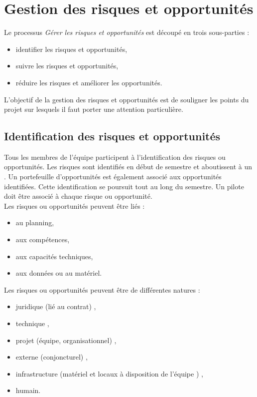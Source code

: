 \section{Gestion des risques et opportunités} 
\label{gestion_risques_opportunitees}

Le processus \textit{Gérer les risques et opportunités} est découpé en trois sous-parties : 
\begin{itemize}
\item identifier les risques et opportunités,
\item suivre les risques et opportunités,
\item réduire les risques et améliorer les opportunités. \\
\end{itemize}

L'objectif de la gestion des risques et opportunités est de souligner les points du projet sur lesquels il faut porter une attention particulière. 

\subsection{Identification des risques et opportunités}
\label{identification_risques_opportunitees}

Tous les membres de l'équipe participent à l'identification des risques ou opportunités. Les risques sont identifiés en début de semestre et aboutissent à un \PR. Un portefeuille d'opportunités est également associé aux opportunités identifiées. Cette identification se poursuit tout au long du semestre. Un pilote doit être associé à chaque risque ou opportunité.\\ 

Les risques ou opportunités peuvent être liés :
\begin{itemize}
\item au planning,
\item aux compétences,
\item aux capacités techniques,
\item aux données ou au matériel. \\
\end{itemize}

Les risques ou opportunités peuvent être de différentes natures :
\begin{itemize}
 \item juridique (lié au contrat) ,
 \item technique ,
 \item projet (équipe, organisationnel) ,
 \item externe (conjoncturel) ,
 \item infrastructure (matériel et locaux à disposition de l’équipe \PICCourt) ,
 \item humain. \\
\end{itemize}


